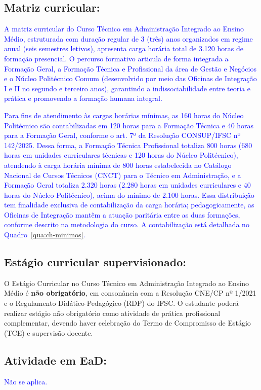\documentclass{../../modelos/latex-shared/ifsc-ppc}
\newcommand{\revisao}[1]{\textcolor{blue}{#1}}
\newcommand{\revisao}[1]{#1}
\begin{document}
\subsection{Matriz curricular:}
\revisao{A matriz curricular do Curso Técnico em Administração Integrado ao Ensino Médio, estruturada com duração regular de 3 (três) anos organizados em regime anual (seis semestres letivos), apresenta carga horária total de 3.120 horas de formação presencial. O percurso formativo articula de forma integrada a Formação Geral, a Formação Técnica e Profissional da área de Gestão e Negócios e o Núcleo Politécnico Comum (desenvolvido por meio das Oficinas de Integração I e II no segundo e terceiro anos), garantindo a indissociabilidade entre teoria e prática e promovendo a formação humana integral.}

\revisao{Para fins de atendimento às cargas horárias mínimas, as 160 horas do Núcleo Politécnico são contabilizadas em 120 horas para a Formação Técnica e 40 horas para a Formação Geral, conforme o art. 7º da Resolução CONSUP/IFSC nº 142/2025. Dessa forma, a Formação Técnica Profissional totaliza 800 horas (680 horas em unidades curriculares técnicas e 120 horas do Núcleo Politécnico), atendendo à carga horária mínima de 800 horas estabelecida no Catálogo Nacional de Cursos Técnicos (CNCT) para o Técnico em Administração, e a Formação Geral totaliza 2.320 horas (2.280 horas em unidades curriculares e 40 horas do Núcleo Politécnico), acima do mínimo de 2.100 horas. Essa distribuição tem finalidade exclusiva de contabilização da carga horária; pedagogicamente, as Oficinas de Integração mantêm a atuação paritária entre as duas formações, conforme descrito na metodologia do curso. A contabilização está detalhada no Quadro~\ref{qua:ch-minimos}.}



\subsection{Estágio curricular supervisionado:}
O Estágio Curricular no Curso Técnico em Administração Integrado ao Ensino Médio é \textbf{não obrigatório}, em consonância com a Resolução CNE/CP nº 1/2021 e o Regulamento Didático-Pedagógico (RDP) do IFSC. O estudante poderá realizar estágio não obrigatório como atividade de prática profissional complementar, devendo haver celebração do Termo de Compromisso de Estágio (TCE) e supervisão docente.

\subsection{Atividade em EaD:}
\revisao{Não se aplica.}
\end{document}
